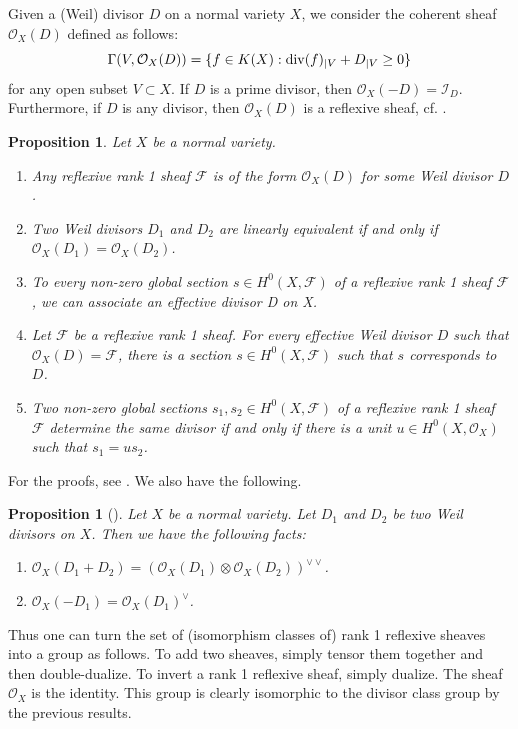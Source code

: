 \documentclass[12pt,reqno]{amsart}
\def\div{\mathop{\rm div}\nolimits}
\newtheorem{prop}[thm]{Proposition}
\theoremstyle{plain}
\theoremstyle{definition}
\begin{document}
Given a (Weil) divisor $D$ on a normal variety $X$, we consider the coherent sheaf $\mathcal O_X (D)$ defined as follows:
$$\Gamma (V,\mathcal O_X(D))=\{f \in K(X): \div(f)_{|V} +D_{|V} \geq 0\}$$
for any open subset $V\subset X$. If  $D$ is a prime divisor, then $\mathcal O_X (-D) = \mathcal I_D$. Furthermore,
if $D$ is any divisor, then $\mathcal O_X (D)$ is a reflexive sheaf, cf. \cite[Proposition 3.4]{Schwede}. 

\begin{prop}\label{prop:1}
Let $X$ be a normal variety. 
\begin{enumerate}
\item Any reflexive rank 1 sheaf $\mathcal F$  is of the form $\mathcal O_X(D)$ for some Weil divisor $D$.
\item Two Weil divisors $D_1$ and $D_2$ are linearly equivalent if and only if $\mathcal O_X (D_1) = \mathcal O_X (D_2)$.
\item To every non-zero global section $s \in H^0 (X,\mathcal F)$ of a reflexive rank 1 sheaf $\mathcal F$, we can associate an effective divisor D on X.
\item Let $\mathcal F$ be a reflexive rank 1 sheaf. For every effective Weil divisor $D$ such that $\mathcal O_X (D) = \mathcal F$, there is a section $s \in H^0(X, \mathcal F )$ such that $s$ corresponds to $D$.
\item Two non-zero global sections $s_1,s_2\in H^0(X, \mathcal F )$ of a reflexive rank 1 sheaf $\mathcal F$ determine the same divisor if and only if there is a unit $u\in H^0(X,\mathcal O_X)$ such that $s_1 = us_2$.
\end{enumerate}
\end{prop}
For the proofs, see \cite[Propositions 3.7, 3.11 and 3.12]{Schwede}. 
We also have the following.
\begin{prop}[{\cite[Theorem 2.8 and Proposition 3.13]{Schwede}}] \label{prop:2}
Let $X$ be a normal variety. Let $D_1$ and $D_2$ be two Weil divisors on $X$. Then we have the following facts:
\begin{enumerate}
\item $\mathcal O_X (D_1+D_2)= (\mathcal O_X (D_1)\otimes \mathcal O_X (D_2))^{\vee\vee}$.
\item $\mathcal O_X (-D_1)=\mathcal O_X (D_1)^\vee$.
\end{enumerate}
\end{prop}
Thus one can turn the set of (isomorphism classes of) rank 1 reflexive sheaves into a group as follows. To add two sheaves, simply tensor them together and then double-dualize. To invert a rank 1 reflexive sheaf, simply dualize. The sheaf $\mathcal O_X$ is the identity. This group is clearly isomorphic to the divisor class group by the previous results.
\end{document}
